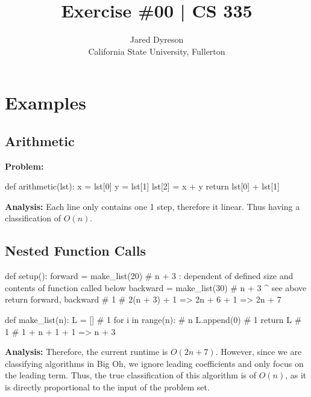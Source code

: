 \documentclass{article}
\title{Exercise \#00 | CS 335}
\author{Jared Dyreson\\ 
        California State University, Fullerton}
\begin{document}
\maketitle
\tableofcontents

\newpage

\section{Examples}

\subsection{Arithmetic}

\begin{flushleft}

\textbf{Problem:}

\begin{python}
def arithmetic(lst):
    x = lst[0]
    y = lst[1]
    lst[2] = x + y
    return lst[0] + lst[1]
\end{python}

\textbf{Analysis:} Each line only contains one 1 step, therefore it linear. Thus having a classification of $O(n)$.

\end{flushleft}

\subsection{Nested Function Calls}

\begin{flushleft}

\begin{python}
def setup():
    forward = make_list(20) # n + 3 : dependent of defined size and contents of function called below
    backward = make_list(30) # n + 3 ^ see above
    return forward, backward # 1
    # 2(n + 3) + 1 => 2n + 6 + 1 => 2n + 7

def make_list(n):
    L = [] # 1
    for i in range(n): # n
        L.append(0) # 1
    return L # 1
    # 1 + n + 1  + 1 => n + 3
\end{python}

\textbf{Analysis:} Therefore, the current runtime is $O(2n + 7)$. However, since we are classifying algorithms in Big Oh, we ignore leading coefficients and only focus on the leading term.
Thus, the true classification of this algorithm is of $O(n)$, as it is directly proportional to the input of the problem set.

\end{flushleft}
\end{document}
